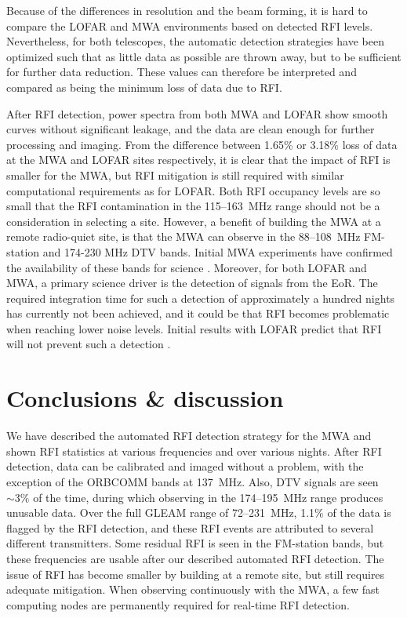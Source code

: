 \documentclass{pasa}
\begin{document}
Because of the differences in resolution and the beam forming, it is hard to compare the LOFAR and MWA environments based on detected RFI levels. Nevertheless, for both telescopes, the automatic detection strategies have been optimized such that as little data as possible are thrown away, but to be sufficient for further data reduction. These values can therefore be interpreted and compared as being the minimum loss of data due to RFI.

After RFI detection, power spectra from both MWA and LOFAR show smooth curves without significant leakage, and the data are clean enough for further processing and imaging. From the difference between 1.65\% or 3.18\% loss of data at the MWA and LOFAR sites respectively, it is clear that the impact of RFI is smaller for the MWA, but RFI mitigation is still required with similar computational requirements as for LOFAR. Both RFI occupancy levels are so small that the RFI contamination in the 115--163~MHz range should not be a consideration in selecting a site. However, a benefit of building the MWA at a remote radio-quiet site, is that the MWA can observe in the 88--108~MHz FM-station and 174-230 MHz DTV bands. Initial MWA experiments have confirmed the availability of these bands for science \citep{mckinley-moon-2013,mwacs-2014}. Moreover, for both LOFAR and MWA, a primary science driver is the detection of signals from the EoR. The required integration time for such a detection of approximately a hundred nights has currently not been achieved, and it could be that RFI becomes problematic when reaching lower noise levels. Initial results with LOFAR predict that RFI will not prevent such a detection \citep{ncp-eor-yatawatta, offringa-rfi-distributions}.

\section{Conclusions \& discussion} \label{ch:conclusions-and-discussion}
We have described the automated RFI detection strategy for the MWA and shown RFI statistics at various frequencies and over various nights. After RFI detection, data can be calibrated and imaged without a problem, with the exception of the ORBCOMM bands at 137~MHz. Also, DTV signals are seen $\sim3\%$ of the time, during which observing in the 174--195~MHz range produces unusable data. Over the full GLEAM range of 72--231~MHz, 1.1\% of the data is flagged by the RFI detection, and these RFI events are attributed to several different transmitters. Some residual RFI is seen in the FM-station bands, but these frequencies are usable after our described automated RFI detection. The issue of RFI has become smaller by building at a remote site, but still requires adequate mitigation. When observing continuously with the MWA, a few fast computing nodes are permanently required for real-time RFI detection.
\end{document}
